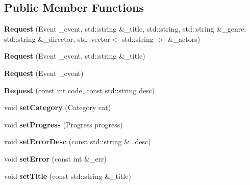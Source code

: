 \subsection*{Public Member Functions}
\begin{DoxyCompactItemize}
\item 
\mbox{\label{classRequest_a91e125c20f0c1923aeb8af789bb24b84}} 
{\bfseries Request} (Event \+\_\+event, std\+::string \&\+\_\+title, std\+::string, std\+::string \&\+\_\+genre, std\+::string \&\+\_\+director, std\+::vector$<$ std\+::string $>$ \&\+\_\+actors)
\item 
\mbox{\label{classRequest_a4ad527cc19ca9ff74f0a5ad9c668b7d8}} 
{\bfseries Request} (Event \+\_\+event, std\+::string \&\+\_\+title)
\item 
\mbox{\label{classRequest_a8c53f5955545d3b4b060eb956858f089}} 
{\bfseries Request} (Event \+\_\+event)
\item 
\mbox{\label{classRequest_a77b64a169dc4a3383f2266cadfdee50a}} 
{\bfseries Request} (const int code, const std\+::string desc)
\item 
\mbox{\label{classRequest_a580a7d5ebcd266767b79bbcc234227b2}} 
void {\bfseries set\+Category} (Category cat)
\item 
\mbox{\label{classRequest_a1ae3d3d7aa87535e05b69bf64ce3eda6}} 
void {\bfseries set\+Progress} (Progress progress)
\item 
\mbox{\label{classRequest_a11d39b9c7e5093a5c55cbec0e8beb4fb}} 
void {\bfseries set\+Error\+Desc} (const std\+::string \&\+\_\+desc)
\item 
\mbox{\label{classRequest_ad0baa58662f3f7883a829b3602d01613}} 
void {\bfseries set\+Error} (const int \&\+\_\+err)
\item 
\mbox{\label{classRequest_afb77a964fd67486cfa1109c5f45fa240}} 
void {\bfseries set\+Title} (const std\+::string \&\+\_\+title)
\item 
\mbox{\label{classRequest_ad11774b94f08627220f093561be85b2a}} 

\end{DoxyCompactItemize}
